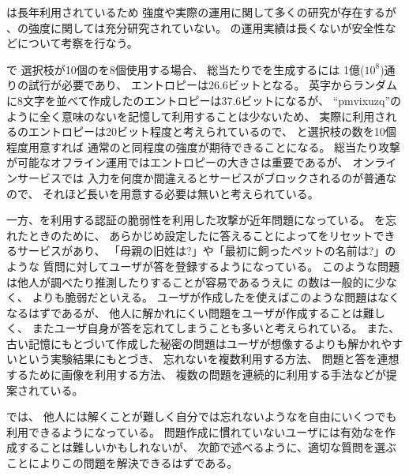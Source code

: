 \documentclass[twoside]{wiss}
\begin{document}


{\PW}は長年利用されているため
強度や実際の運用に関して多くの研究が存在するが%
\cite{Hayashi:2011:DSP:1978942.1979326}%
\cite{Komanduri:2011:PPM:1978942.1979321}%
、{\SQ}の強度に関しては充分研究されていない。
{\EP}の運用実績は長くないが安全性などについて考察を行なう。

{\EP}で
選択枝が10個の{\SQ}を8個使用する場合、
総当たりで{\PW}を生成するには
1億($10^8$)通りの試行が必要であり、
エントロピーは26.6ビットとなる。
英字からランダムに8文字を並べて作成した{\PW}のエントロピーは37.6ビットになるが、
``\textsf{pmvixuzq}''のように全く意味のない{\PW}を記憶して利用することは少ないため、
実際に利用される{\PW}のエントロピーは20ビット程度と考えられているので\cite{NIST}、
{\SQ}と選択枝の数を10個程度用意すれば
通常の{\PW}と同程度の強度が期待できることになる。
%
総当たり攻撃が可能なオフライン運用ではエントロピーの大きさは重要であるが、
オンラインサービスでは
{\PW}入力を何度か間違えるとサービスがブロックされるのが普通なので、
それほど長い{\PW}を用意する必要は無いと考えられている\cite{Florencio:2007:SWP:1361419.1361429}。

一方、{\SQ}を利用する認証の脆弱性を利用した攻撃が近年問題になっている。
{\PW}を忘れたときのために、
あらかじめ設定した{\SQ}に答えることによって{\PW}をリセットできるサービスがあり、
「母親の旧姓は?」や「最初に飼ったペットの名前は?」のような
質問に対してユーザが答を登録するようになっている。
このような問題は他人が調べたり推測したりすることが容易であるうえに
{\SQ}の数は一般的に少なく、
{\PW}よりも脆弱だといえる\cite{Rabkin:2008:PKQ:1408664.1408667}。%
%
ユーザが作成した{\SQ}を使えばこのような問題はなくなるはずであるが、
他人に解かれにくい問題をユーザが作成することは難しく、
またユーザ自身が答を忘れてしまうことも多いと考えられている\cite{Just:2009:PCC:1572532.1572543}\cite{Schechter:2009:NSM:1607723.1608145}。
%
また、古い記憶にもとづいて作成した秘密の問題はユーザが想像するよりも解かれやすいという実験結果にもとづき、
忘れない{\SQ}を複数利用する方法、
問題と答を連想するために画像を利用する方法、
複数の問題を連続的に利用する手法などが提案されている\cite{Renaud:2010:PQE:2146303.2146318}。

{\EP}では、
他人には解くことが難しく自分では忘れないような{\SQ}を自由にいくつでも利用できるようになっている。
問題作成に慣れていないユーザには有効な{\SQ}を作成することは難しいかもしれないが、
次節で述べるように、適切な質問を選ぶことによりこの問題を解決できるはずである。
\end{document}
